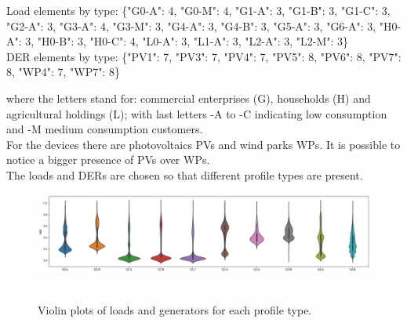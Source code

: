 \begin{algorithm}[h]
\State Load elements by type: \{"G0-A": 4, "G0-M": 4, "G1-A": 3, "G1-B": 3, "G1-C": 3, "G2-A": 3, "G3-A": 4, "G3-M": 3, "G4-A": 3, "G4-B": 3, "G5-A": 3, "G6-A": 3, "H0-A": 3, "H0-B": 3, "H0-C": 4, "L0-A": 3, "L1-A": 3, "L2-A": 3, "L2-M": 3\}\\

\State DER elements by type: \{"PV1": 7, "PV3": 7, "PV4": 7, "PV5": 8, "PV6": 8, "PV7": 8, "WP4": 7, "WP7": 8\}
\end{algorithm}
\noindent where the letters stand for: commercial enterprises (G), households (H) and agricultural holdings (L); with last letters -A to -C indicating low consumption and -M medium consumption customers. \\
For the  devices there are photovoltaics \glspl{PV} and wind parks \glspl{WP}. It is possible to notice a bigger presence of \glspl{PV} over \glspl{WP}.\\

The loads and \glspl{DER} are chosen so that different profile types are present.

\begin{figure}[H]
\centering
    \includegraphics[width=0.95\linewidth]    {images/MVOberr/ViolinPlotLoad1.png}\\
    
    \\
    
\caption[Violin plots of loads and generators]{Violin plots of loads and generators for each profile type.}
\label{fig:lodprof}
\end{figure}


